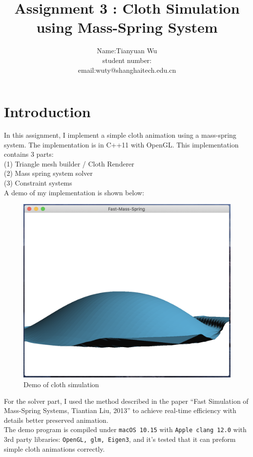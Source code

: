 \documentclass[acmtog]{acmart}
\title{Assignment 3 : Cloth Simulation using Mass-Spring System}
\author{Name:\quad Tianyuan Wu  \\ student number:\quad 63305667
	\\email:\quad wuty@shanghaitech.edu.cn}
\begin{document}
\maketitle

\vspace*{2 ex}


\section{Introduction}
In this assignment, I implement a simple cloth animation using a mass-spring system.
The implementation is in C++11 with OpenGL. This implementation contains 3 parts:\\
(1) Triangle mesh builder / Cloth Renderer\\
(2) Mass spring system solver\\
(3) Constraint systems\\
A demo of my implementation is shown below:
\begin{figure}[H]
	\centering
	\includegraphics[scale=0.25]{./circle2.png}
	\caption{Demo of cloth simulation}
\end{figure}
For the solver part, I used the method described in the paper ``Fast Simulation of 
Mass-Spring Systems, Tiantian Liu, 2013'' to achieve real-time efficiency with details 
better preserved animation.\\
The demo program is compiled under \texttt{macOS 10.15} with \texttt{Apple clang 12.0} 
with 3rd party libraries: \texttt{OpenGL, glm, Eigen3}, and it's tested that it can 
preform simple cloth animations correctly.
\end{document}
